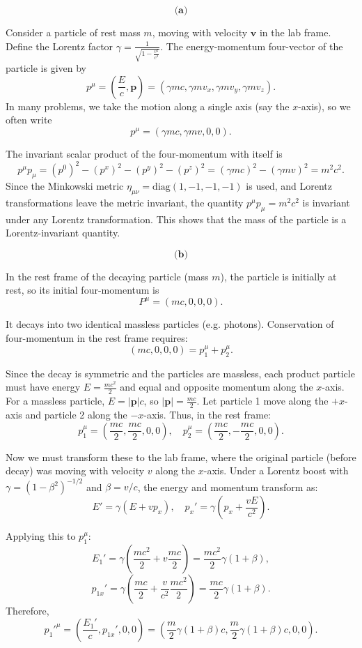 \documentclass{article}
\begin{document}
\[
\textbf{(a)} 
\]

Consider a particle of rest mass \(m\), moving with velocity \(\mathbf{v}\) in the lab frame. Define the Lorentz factor \(\gamma = \frac{1}{\sqrt{1-\frac{v^2}{c^2}}}\). The energy-momentum four-vector of the particle is given by
\[
p^\mu = \left(\frac{E}{c}, \mathbf{p}\right) = \left(\gamma mc, \gamma m v_x, \gamma m v_y, \gamma m v_z\right).
\]
In many problems, we take the motion along a single axis (say the \(x\)-axis), so we often write
\[
p^\mu = (\gamma mc, \gamma m v, 0, 0).
\]

The invariant scalar product of the four-momentum with itself is
\[
p^\mu p_\mu = (p^0)^2 - (p^x)^2 - (p^y)^2 - (p^z)^2 = (\gamma mc)^2 - (\gamma m v)^2 = m^2 c^2.
\]
Since the Minkowski metric \(\eta_{\mu\nu} = \text{diag}(1, -1, -1, -1)\) is used, and Lorentz transformations leave the metric invariant, the quantity \(p^\mu p_\mu = m^2 c^2\) is invariant under any Lorentz transformation. This shows that the mass of the particle is a Lorentz-invariant quantity.


\[
\textbf{(b)}
\]

In the rest frame of the decaying particle (mass \(m\)), the particle is initially at rest, so its initial four-momentum is
\[
P^\mu = (m c, 0, 0, 0).
\]

It decays into two identical massless particles (e.g. photons). Conservation of four-momentum in the rest frame requires:
\[
(m c, 0, 0, 0) = p_1^\mu + p_2^\mu.
\]

Since the decay is symmetric and the particles are massless, each product particle must have energy \(E = \frac{m c^2}{2}\) and equal and opposite momentum along the \(x\)-axis. For a massless particle, \(E = |\mathbf{p}| c\), so \(|\mathbf{p}| = \frac{m c}{2}\). Let particle 1 move along the \(+x\)-axis and particle 2 along the \(-x\)-axis. Thus, in the rest frame:
\[
p_1^\mu = \left(\frac{m c}{2}, \frac{m c}{2}, 0, 0\right), \quad p_2^\mu = \left(\frac{m c}{2}, -\frac{m c}{2}, 0, 0\right).
\]

Now we must transform these to the lab frame, where the original particle (before decay) was moving with velocity \(v\) along the \(x\)-axis. Under a Lorentz boost with \(\gamma = (1-\beta^2)^{-1/2}\) and \(\beta = v/c\), the energy and momentum transform as:
\[
E' = \gamma (E + v p_x), \quad p_x' = \gamma (p_x + \frac{v E}{c^2}).
\]

Applying this to \(p_1^\mu\):
\[
E_1' = \gamma\left(\frac{m c^2}{2} + v \frac{m c}{2}\right) = \frac{m c^2}{2}\gamma(1+\beta),
\]
\[
p_{1x}' = \gamma\left(\frac{m c}{2} + \frac{v}{c^2} \frac{m c^2}{2}\right) = \frac{m c}{2}\gamma(1+\beta).
\]
Therefore,
\[
p_1'^\mu = \left(\frac{E_1'}{c}, p_{1x}',0,0\right) = \left(\frac{m}{2}\gamma(1+\beta)c, \frac{m}{2}\gamma(1+\beta)c, 0, 0\right).
\]
\end{document}
